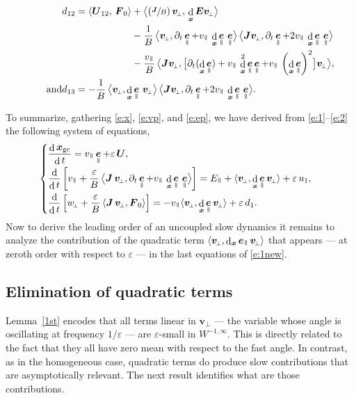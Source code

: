 \documentclass[JEP,XML,SOM,Unicode]{cedram}
\newenvironment{splitcases}
{\begin{cases}\begin{aligned}}
{\end{aligned}\end{cases}}
\newcommand{\sperp}{{\scriptscriptstyle\perp}}
\newcommand{\blangle}{\bigl\langle}
\newcommand{\brangle}{\bigr\rangle}
\newcommand{\Psfrac}[2]{(\sfrac{#1}{#2})}
\let\eps\varepsilon
\let\d\partial
\DeclareMathOperator\dD{d}\let\dd\dD
\theoremstyle{plain}
\theoremstyle{definition}
\newcommand{\be}{\begin{equation}}
\newcommand{\ee}{\end{equation}}
\newcommand\bE{{\boldsymbol E}}
\newcommand\bF{{\boldsymbol F}}
\newcommand\bJ{{\boldsymbol J}}
\newcommand\bU{{\boldsymbol U}}
\newcommand\bfv{{\boldsymbol v}}
\newcommand\bfx{{\boldsymbol x}}
\DeclareMathOperator{\beD}{\boldsymbol{e}}
\newcommand\eDpar{\beD_\mypar}
\newcommand\vpar{v_\mypar}
\newcommand\bvperp{\bfv_{\!\sperp}}
\newcommand\eperp{w_{\!\sperp}}
\newcommand\Epar{E_\mypar}
\newcommand{\GC}{\bfx_\mathrm{gc}}
\newcommand{\mypar}{{\mkern3mu\vphantom{\perp}\vrule depth 0pt\mkern2mu\vrule depth 0pt\mkern3mu}}
\begin{document}
\begin{align*}
d_{12}&=\langle \bU_{12},\,\bF_0\rangle
+
\blangle\Psfrac{\bJ}{B}\,\bvperp,\,\dD_\bfx\bE\bvperp\brangle\\
&\hphantom{{}=\langle \bU_{12},\,\bF_0\rangle}
-\frac{1}{B}\, \blangle \bvperp,\d_t\eDpar+\vpar\,\dD_{\bfx}\eDpar\,\eDpar\brangle\,
\blangle\bJ\bvperp,\d_t\eDpar+2\vpar\,\dD_{\bfx}\eDpar\,\eDpar\brangle
\\
&\hphantom{{}=\langle \bU_{12},\,\bF_0\rangle}
- \frac{\vpar}{B}\, \blangle \bJ\bvperp,
\bigl[\d_t(\dD_\bfx\eDpar)+\vpar\,\dD_{\bfx}^2\eDpar\eDpar+\vpar\,\left(\dD_{\bfx}\eDpar\right)^2\bigr]\bvperp \brangle,\\
\tag*{and}
d_{13}&= -\frac{1}{B} \, \blangle \bvperp, \dD_{\bfx}\eDpar\,\bvperp\brangle\,\blangle
\bJ\bvperp,\d_t\eDpar+2\vpar\,\dD_{\bfx}\eDpar\,\eDpar\brangle.
\end{align*}

To summarize, gathering \eqref{e:x}, \eqref{e:vp}, and \eqref{e:ep}, we have derived from \eqref{e:1}--\eqref{e:2} the following system of equations,
\be
\label{e:1new}
\begin{splitcases}
&\frac{\dD \GC}{\dD t}
= \vpar\eDpar+\eps \,\bU,
\\
&\frac{\dD}{\dD t}\left[\vpar
+\frac{\eps}{B}\,\blangle\bJ\,\bvperp,\d_t\eDpar+\vpar\,\dD_{\bfx}\eDpar\,\eDpar\brangle\right] =\Epar
+\langle\bvperp,\dD_{\bfx}\eDpar\bvperp\rangle
+\eps \,u_1,\\
&\frac{\dD}{\dD t}\left[\eperp + \frac{\eps}{B}\,\langle
{\bJ}\,\bvperp,\bF_0\rangle
\right]=-\vpar\langle\bvperp,\dD_{\bfx}\eDpar\bvperp\rangle+\eps \,d_1.
\end{splitcases}
\ee
Now to derive the leading order of an uncoupled slow dynamics it remains to analyze the contribution of the quadratic term $\langle\bvperp,\dD_{\bfx}\eDpar\bvperp\rangle$ that appears --- at zeroth order with respect to
$\eps$ --- in the last equations of \eqref{e:1new}.

\subsection{Elimination of quadratic terms}
\label{s:quadratic}

Lemma~\ref{1st} encodes that all terms linear in $\bvperp$ --- the variable whose angle is oscillating at frequency $1/\eps$ --- are $\eps$-small in $W^{-1,\infty}$. This is directly related to the fact that they all have zero mean with respect to the fast angle. In contrast, as in the homogeneous case, quadratic terms do produce slow contributions that are asymptotically relevant. The next result identifies what are those contributions.
\end{document}
